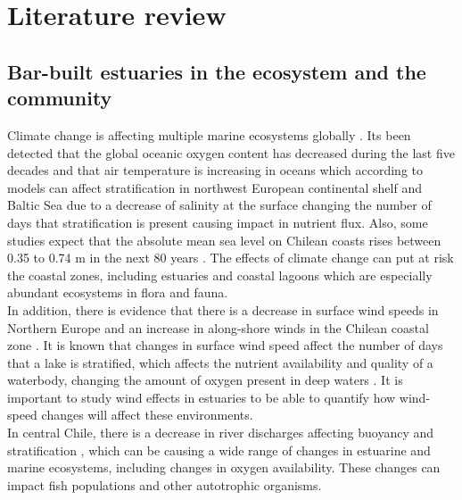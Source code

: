 \documentclass[tesis.tex]{subfiles}
\begin{document}
    
\section{Literature review}

\subsection{Bar-built estuaries in the ecosystem and the community}

Climate change is affecting multiple marine ecosystems globally \citep{hewitt2016multiple}. Its been detected that the global oceanic oxygen content has decreased during the last five decades \citep{schmidtko2017decline} and that air temperature is increasing in oceans \citep{omstedt2004baltic, jones1999surface} which according to models can affect stratification in northwest European continental shelf and Baltic Sea due to a decrease of salinity at the surface \citep{hordoir2012effect, holt2010potential} changing the number of days that stratification is present causing impact in nutrient flux. Also, some studies expect that the absolute mean sea level on Chilean coasts rises between 0.35 to 0.74 m in the next 80 years \citep{winckler2020evidence}. The effects of climate change can put at risk the coastal zones, including estuaries and coastal lagoons which are especially abundant ecosystems in flora and fauna.\\

In addition, there is evidence that there is a decrease in surface wind speeds in Northern Europe \citep{woolway2017atmospheric} and an increase in along-shore winds in the Chilean coastal zone \citep{winckler2020evidence}. It is known that changes in surface wind speed affect the number of days that a lake is stratified, which affects the nutrient availability and quality of a waterbody, changing the amount of oxygen present in deep waters \citep{woolway2017atmospheric}. It is important to study wind effects in estuaries to be able to quantify how wind-speed changes will affect these environments.\\

In central Chile, there is a decrease in river discharges affecting buoyancy and stratification \citep{winckler2020evidence}, which can be causing a wide range of changes in estuarine and marine ecosystems, including changes in oxygen availability. These changes can impact fish populations and other autotrophic organisms.\\
\end{document}
